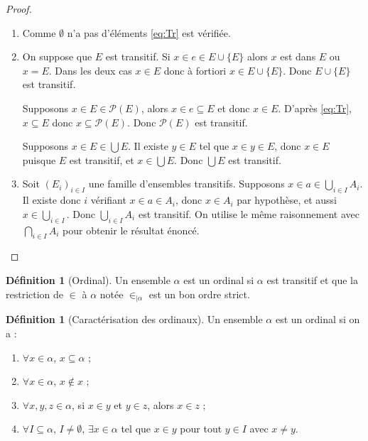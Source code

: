 \documentclass{article}
\theoremstyle{definition}
\newtheorem{definition}[subsubsection]{Définition}
\theoremstyle{plain}
\theoremstyle{plain}
\theoremstyle{plain}
\theoremstyle{plain}
\begin{document}
\begin{proof}
	\begin{enumerate}[label = (\roman*)]
		\item Comme \( \emptyset \) n'a pas d'éléments \eqref{eq:Tr} est vérifiée.
		\item On suppose que \( E \) est transitif. Si \( x \in e \in E \cup \{E\} \) alors \( x \) est dans \( E \) ou \( x = E \). Dans les deux cas \( x \in E \) donc à fortiori \( x \in E \cup \{E\} \). Donc \( E \cup \{E\} \) est transitif.

			Supposons \( x \in E \in \mathcal{P}(E) \), alors \( x \in e \subseteq E \) et donc \( x \in E \). D'après \eqref{eq:Tr}, \( x \subseteq E \) donc \( x \subseteq \mathcal{P}(E)\). Donc \( \mathcal{P}(E) \) est transitif.

			Supposons \( x \in E \in \bigcup E \). Il existe \( y \in E \) tel que \( x \in y \in E \), donc \( x \in E \) puisque \( E \) est transitif, et \( x \in \bigcup E \). Donc \( \bigcup E \) est transitif.
		\item Soit \( (E_{i})_{i \in I} \) une famille d'ensembles transitifs. Supposons \( x \in a \in \bigcup_{i\in I} A_{i} \). Il existe donc \( i \) vérifiant \( x \in a \in A_{i} \), donc \( x \in A_{i} \) par hypothèse, et aussi \( x \in \bigcup_{i \in I}\). Donc \( \bigcup_{i \in I} A_{i} \) est transitif. On utilise le même raisonnement avec \( \bigcap_{i \in I} A_{i} \) pour obtenir le résultat énoncé.
	\end{enumerate}
\end{proof}

\begin{definition}[Ordinal]
	Un ensemble \( \alpha \) est un ordinal si \( \alpha \) est transitif et que la restriction de \( \in  \) à \( \alpha \) notée \( \in_{|\alpha} \) est un bon ordre strict.
\end{definition}

\begin{definition}[Caractérisation des ordinaux]
	Un ensemble \( \alpha \) est un ordinal si on a :
	\begin{enumerate}[label = (\roman*)]
		\item \( \forall x \in \alpha \), \( x \subseteq \alpha \) ;
		\item \( \forall x \in \alpha \), \( x \not\in x \) ;
		\item \( \forall x, y, z \in \alpha \), si \( x \in y \) et \( y \in z \), alors \( x \in z \) ;
		\item \( \forall I \subseteq \alpha \), \( I \neq \emptyset \), \( \exists x \in \alpha \) tel que \( x \in y \) pour tout \( y \in I \) avec \( x \neq y \).
	\end{enumerate}
\end{definition}
\end{document}

